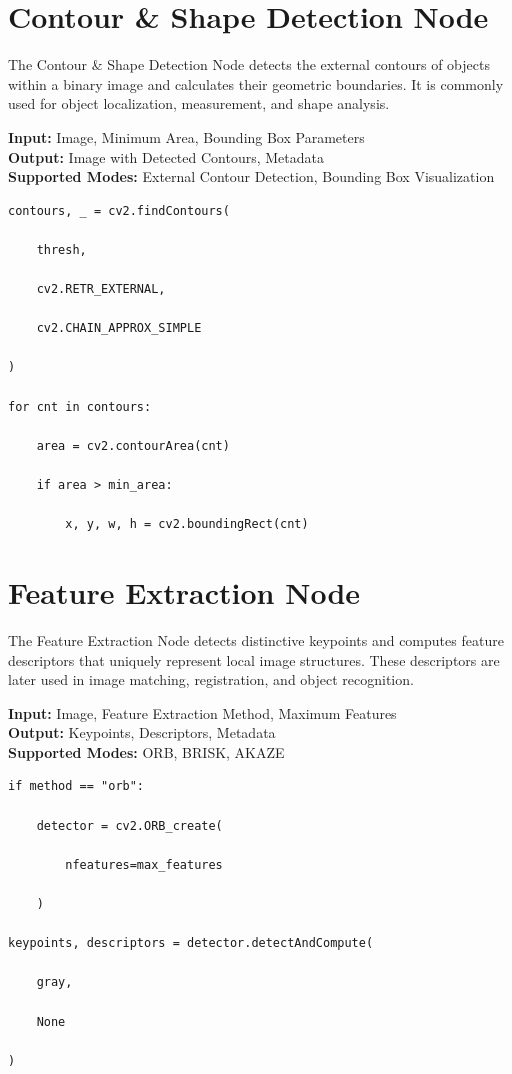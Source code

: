 \documentclass[a4paper,12pt]{report}
\begin{document}
\section{Contour \& Shape Detection Node}
\label{sec:contour-shape-detection-node}

The Contour \& Shape Detection Node detects the external contours of
objects within a binary image and calculates their geometric boundaries.
It is commonly used for object localization, measurement, and shape
analysis.

\noindent \textbf{Input:} Image, Minimum Area, Bounding Box Parameters \\
\textbf{Output:} Image with Detected Contours, Metadata \\
\textbf{Supported Modes:} External Contour Detection, Bounding Box Visualization

\begin{lstlisting}[caption={Core Algorithm}, label={lst:contour-shape-detection-node}]
contours, _ = cv2.findContours(

    thresh,

    cv2.RETR_EXTERNAL,

    cv2.CHAIN_APPROX_SIMPLE

)

for cnt in contours:

    area = cv2.contourArea(cnt)

    if area > min_area:

        x, y, w, h = cv2.boundingRect(cnt)
\end{lstlisting}

\section{Feature Extraction Node}
\label{sec:feature-extraction-node}

The Feature Extraction Node detects distinctive keypoints and computes
feature descriptors that uniquely represent local image structures. These
descriptors are later used in image matching, registration, and object
recognition.

\noindent \textbf{Input:} Image, Feature Extraction Method, Maximum Features \\
\textbf{Output:} Keypoints, Descriptors, Metadata \\
\textbf{Supported Modes:} ORB, BRISK, AKAZE

\begin{lstlisting}[caption={Core Algorithm}, label={lst:feature-extraction-node}]
if method == "orb":

    detector = cv2.ORB_create(

        nfeatures=max_features

    )

keypoints, descriptors = detector.detectAndCompute(

    gray,

    None

)
\end{lstlisting}
\end{document}
